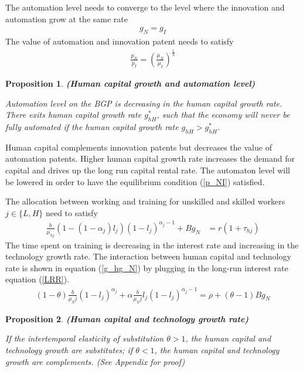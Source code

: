 \documentclass[12pt]{article}
\newtheorem{proposition}{Proposition}
\begin{document}
The automation level needs to converge to the level where the innovation and automation grow at the same rate
\begin{align}
\label{g_NI}
g_N = g_I 
\end{align}
The value of automation and innovation patent needs to satisfy
\begin{align}
\label{p_NI}
\frac{p_N}{p_I} = (\frac{\mu_N}{\mu_I})^{\frac{1}{\lambda}}
\end{align}
\begin{proposition}{\bf (Human capital growth and automation level)}

Automation level on the BGP is decreasing in the human capital growth rate. There exits human capital growth rate $g_{hH}^*$, such that the economy will never be fully automated if the human capital growth rate $g_{hH}>g_{hH}^*$. 
\end{proposition}

Human capital complements innovation patents but decreases the value of automation patents. Higher human capital growth rate increases the demand for capital and drives up the long run capital rental rate. The automaton level will be lowered in order to have the equilibrium condition (\ref{p_NI}) satisfied.

The allocation between working and training for unskilled and skilled workers $j\in\{L,H\}$ need to satisfy
\begin{align*}
\frac{b}{\mu_{hj}}(1-(1-\alpha_j)l_j)(1-l_j)^{\alpha_j-1}+Bg_N&= r(1+\tau_{hj}) 
\end{align*}
The time spent on training is decreasing in the interest rate and increasing in the technology growth rate. The interaction between human capital and technology rate is shown in equation (\ref{g_hg_N}) by plugging in the long-run interest rate equation (\ref{LRR}). 
\begin{align} 
\label{g_hg_N}
(1-\theta)\frac{b}{\mu_hj}(1-l_j)^{\alpha_j}+\alpha\frac{b}{\mu_hj}l_j(1-l_j)^{\alpha_j-1} = \rho+(\theta-1)Bg_N
\end{align}

\begin{proposition}{\bf (Human capital and technology growth rate)}

If the intertemporal elasticity of substitution $\theta>1$, the human capital and technology growth are substitutes; if $\theta<1$, the human capital and technology growth are complements. (See Appendix for proof)
\end{proposition}
\end{document}
